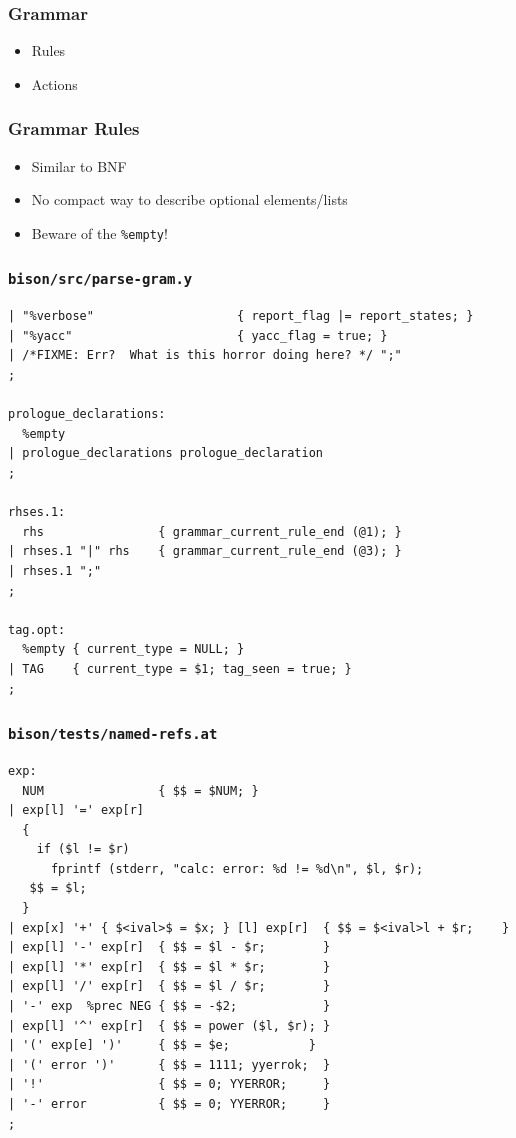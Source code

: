 \documentclass{beamer}
\begin{document}
\begin{frame}
  \frametitle{Grammar}
    \begin{itemize}
      \item Rules
      \item Actions
    \end{itemize}
\end{frame}

\begin{frame}
  \frametitle{Grammar Rules}
    \begin{itemize}
      \item Similar to BNF
      \item No compact way to describe optional elements/lists
      \item Beware of the \texttt{\%empty}!
    \end{itemize}
\end{frame}

\begin{frame}[fragile,shrink=25]
  \frametitle{\texttt{bison/src/parse-gram.y}}
\begin{verbatim}
| "%verbose"                    { report_flag |= report_states; }
| "%yacc"                       { yacc_flag = true; }
| /*FIXME: Err?  What is this horror doing here? */ ";"
;

prologue_declarations:
  %empty
| prologue_declarations prologue_declaration
;

rhses.1:
  rhs                { grammar_current_rule_end (@1); }
| rhses.1 "|" rhs    { grammar_current_rule_end (@3); }
| rhses.1 ";"
;

tag.opt:
  %empty { current_type = NULL; }
| TAG    { current_type = $1; tag_seen = true; }
;
\end{verbatim}
\end{frame}

\begin{frame}[fragile,shrink=25]
  \frametitle{\texttt{bison/tests/named-refs.at}}
\begin{verbatim}
exp:
  NUM                { $$ = $NUM; }
| exp[l] '=' exp[r]
  {
    if ($l != $r)
      fprintf (stderr, "calc: error: %d != %d\n", $l, $r);
   $$ = $l;
  }
| exp[x] '+' { $<ival>$ = $x; } [l] exp[r]  { $$ = $<ival>l + $r;    }
| exp[l] '-' exp[r]  { $$ = $l - $r;        }
| exp[l] '*' exp[r]  { $$ = $l * $r;        }
| exp[l] '/' exp[r]  { $$ = $l / $r;        }
| '-' exp  %prec NEG { $$ = -$2;            }
| exp[l] '^' exp[r]  { $$ = power ($l, $r); }
| '(' exp[e] ')'     { $$ = $e;           }
| '(' error ')'      { $$ = 1111; yyerrok;  }
| '!'                { $$ = 0; YYERROR;     }
| '-' error          { $$ = 0; YYERROR;     }
;
\end{verbatim}
\end{frame}
\end{document}
